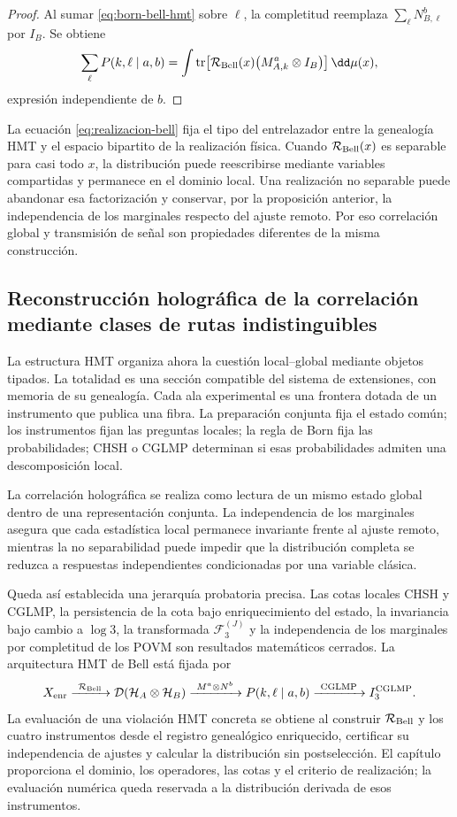 \begin{proof}
Al sumar \eqref{eq:born-bell-hmt} sobre \(\ell\), la completitud reemplaza
\(\sum_\ell N_{B,\ell}^{b}\) por \(I_B\). Se obtiene
\[
 \sum_{\ell}P(k,\ell\mid a,b)
 =\int\operatorname{tr}\!\left[
   \mathcal R_{\rm Bell}(x)
   \bigl(M_{A,k}^{a}\otimes I_B\bigr)
  \right]\dd\mu(x),
\]
expresión independiente de \(b\).
\end{proof}

La ecuación \eqref{eq:realizacion-bell} fija el tipo del entrelazador entre la
genealogía HMT y el espacio bipartito de la realización física. Cuando
\(\mathcal R_{\rm Bell}(x)\) es separable para casi todo \(x\), la distribución
puede reescribirse mediante variables compartidas y permanece en el dominio local.
Una realización no separable puede abandonar esa factorización y conservar, por la
proposición anterior, la independencia de los marginales respecto del ajuste remoto.
Por eso correlación global y transmisión de señal son propiedades diferentes de la
misma construcción.

\subsection{Reconstrucción holográfica de la correlación mediante clases de rutas indistinguibles}

La estructura HMT organiza ahora la cuestión local--global mediante objetos tipados.
La totalidad es una sección compatible del sistema de
extensiones, con memoria de su genealogía. Cada ala experimental es una frontera
dotada de un instrumento que publica una fibra. La preparación conjunta fija el
estado común; los instrumentos fijan las preguntas locales; la regla de Born fija
las probabilidades; CHSH o CGLMP determinan si esas probabilidades admiten una
descomposición local.

La correlación holográfica se realiza como lectura de un mismo estado global dentro
de una representación conjunta. La independencia de los marginales asegura que cada
estadística local permanece invariante frente al ajuste remoto, mientras la no
separabilidad puede
impedir que la distribución completa se reduzca a respuestas independientes
condicionadas por una variable clásica.

Queda así establecida una jerarquía probatoria precisa. Las cotas locales CHSH y
CGLMP, la persistencia de la cota bajo enriquecimiento del estado, la invariancia
bajo cambio a \(\log 3\), la transformada \(\mathcal F_3^{(J)}\) y la independencia
de los marginales por completitud de los POVM son resultados matemáticos cerrados.
La arquitectura HMT de
Bell está fijada por
\[
 X_{\rm enr}
 \xrightarrow{\ \mathcal R_{\rm Bell}\ }
 \mathcal D(\mathcal H_A\otimes\mathcal H_B)
 \xrightarrow{\ M^a\otimes N^b\ }
 P(k,\ell\mid a,b)
 \xrightarrow{\ \mathrm{CGLMP}\ }
 I_3^{\rm CGLMP}.
\]
La evaluación de una violación HMT concreta se obtiene al construir
\(\mathcal R_{\rm Bell}\) y los cuatro instrumentos desde el registro genealógico enriquecido,
certificar su independencia de ajustes y calcular la distribución sin
postselección. El capítulo proporciona el dominio, los operadores, las cotas y el
criterio de realización; la evaluación numérica queda reservada a la distribución
derivada de esos instrumentos.
